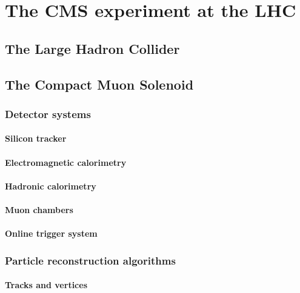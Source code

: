 \chapter{The CMS experiment at the LHC}
\label{sec:cms}

\section{The Large Hadron Collider}

\section{The Compact Muon Solenoid}

\subsection{Detector systems}

\subsubsection{Silicon tracker}

\subsubsection{Electromagnetic calorimetry}

\subsubsection{Hadronic calorimetry}

\subsubsection{Muon chambers}

\subsubsection{Online trigger system}

\subsection{Particle reconstruction algorithms}

\subsubsection{Tracks and vertices}

